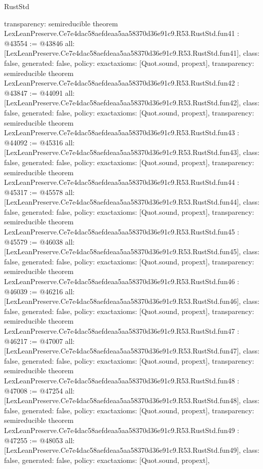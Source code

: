 \begin{lexlean}{RustStd}
\begin{coremodule}
{  transparency: semireducible
}
theorem LexLeanPreserve.Ce7e4dac58aefdeaa5aa58370d36e91c9.R53.RustStd.fun41 : @43554 := @43846 {
  all: [LexLeanPreserve.Ce7e4dac58aefdeaa5aa58370d36e91c9.R53.RustStd.fun41],
  class: false,
  generated: false,
  policy: exact{axioms: [Quot.sound, propext]},
  transparency: semireducible
}
theorem LexLeanPreserve.Ce7e4dac58aefdeaa5aa58370d36e91c9.R53.RustStd.fun42 : @43847 := @44091 {
  all: [LexLeanPreserve.Ce7e4dac58aefdeaa5aa58370d36e91c9.R53.RustStd.fun42],
  class: false,
  generated: false,
  policy: exact{axioms: [Quot.sound, propext]},
  transparency: semireducible
}
theorem LexLeanPreserve.Ce7e4dac58aefdeaa5aa58370d36e91c9.R53.RustStd.fun43 : @44092 := @45316 {
  all: [LexLeanPreserve.Ce7e4dac58aefdeaa5aa58370d36e91c9.R53.RustStd.fun43],
  class: false,
  generated: false,
  policy: exact{axioms: [Quot.sound, propext]},
  transparency: semireducible
}
theorem LexLeanPreserve.Ce7e4dac58aefdeaa5aa58370d36e91c9.R53.RustStd.fun44 : @45317 := @45578 {
  all: [LexLeanPreserve.Ce7e4dac58aefdeaa5aa58370d36e91c9.R53.RustStd.fun44],
  class: false,
  generated: false,
  policy: exact{axioms: [Quot.sound, propext]},
  transparency: semireducible
}
theorem LexLeanPreserve.Ce7e4dac58aefdeaa5aa58370d36e91c9.R53.RustStd.fun45 : @45579 := @46038 {
  all: [LexLeanPreserve.Ce7e4dac58aefdeaa5aa58370d36e91c9.R53.RustStd.fun45],
  class: false,
  generated: false,
  policy: exact{axioms: [Quot.sound, propext]},
  transparency: semireducible
}
theorem LexLeanPreserve.Ce7e4dac58aefdeaa5aa58370d36e91c9.R53.RustStd.fun46 : @46039 := @46216 {
  all: [LexLeanPreserve.Ce7e4dac58aefdeaa5aa58370d36e91c9.R53.RustStd.fun46],
  class: false,
  generated: false,
  policy: exact{axioms: [Quot.sound, propext]},
  transparency: semireducible
}
theorem LexLeanPreserve.Ce7e4dac58aefdeaa5aa58370d36e91c9.R53.RustStd.fun47 : @46217 := @47007 {
  all: [LexLeanPreserve.Ce7e4dac58aefdeaa5aa58370d36e91c9.R53.RustStd.fun47],
  class: false,
  generated: false,
  policy: exact{axioms: [Quot.sound, propext]},
  transparency: semireducible
}
theorem LexLeanPreserve.Ce7e4dac58aefdeaa5aa58370d36e91c9.R53.RustStd.fun48 : @47008 := @47254 {
  all: [LexLeanPreserve.Ce7e4dac58aefdeaa5aa58370d36e91c9.R53.RustStd.fun48],
  class: false,
  generated: false,
  policy: exact{axioms: [Quot.sound, propext]},
  transparency: semireducible
}
theorem LexLeanPreserve.Ce7e4dac58aefdeaa5aa58370d36e91c9.R53.RustStd.fun49 : @47255 := @48053 {
  all: [LexLeanPreserve.Ce7e4dac58aefdeaa5aa58370d36e91c9.R53.RustStd.fun49],
  class: false,
  generated: false,
  policy: exact{axioms: [Quot.sound, propext]},
}
\end{coremodule}
\end{lexlean}
